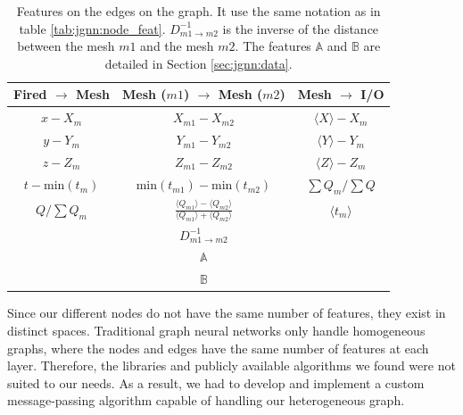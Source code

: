 \documentclass[../main.tex]{subfiles}
\begin{document}
\begin{table}
  \centering
  \begin{tabular}{|c|c|c|}
    \hline
    Fired $\rightarrow$ Mesh & Mesh ($m1$) $\rightarrow$ Mesh ($m2$) & Mesh $\rightarrow$ I/O \\
    \hline \hline
    $x - X_m$ & $X_{m1} - X_{m2}$ & $\langle X \rangle - X_m$ \\
    $y - Y_m$ & $Y_{m1} - Y_{m2}$ & $\langle Y \rangle - Y_m$ \\
    $z - Z_m$ & $Z_{m1} - Z_{m2}$ & $\langle Z \rangle - Z_m$ \\
    $t - \mathrm{min}(t_m)$ & $\mathrm{min}(t_{m1}) - \mathrm{min}(t_{m2})$ & $\sum Q_m / \sum Q$ \\
    $Q / \sum Q_m$ & $\frac{\langle Q_{m1} \rangle - \langle Q_{m2} \rangle}{\langle Q_{m1} \rangle + \langle Q_{m2} \rangle}$ & $\langle t_m \rangle$ \\
     & $D^{-1}_{m1 \rightarrow m2}$ & \\
     & $\mathbb{A}$ & \\
     & $\mathbb{B}$ & \\
    \hline
  \end{tabular}
  \caption{Features on the edges on the graph. It use the same notation as in table \ref{tab:jgnn:node_feat}. $D^{-1}_{m1 \rightarrow m2}$ is the inverse of the distance between the mesh $m1$ and the mesh $m2$. The features $\mathbb{A}$ and $\mathbb{B}$ are detailed in Section \ref{sec:jgnn:data}.}
  \label{tab:jgnn:edge_feat}

\end{table}

Since our different nodes do not have the same number of features, they exist in distinct spaces. Traditional graph neural networks only handle homogeneous graphs, where the nodes and edges have the same number of features at each layer. Therefore, the libraries and publicly available algorithms we found were not suited to our needs. As a result, we had to develop and implement a custom message-passing algorithm capable of handling our heterogeneous graph.
\end{document}
